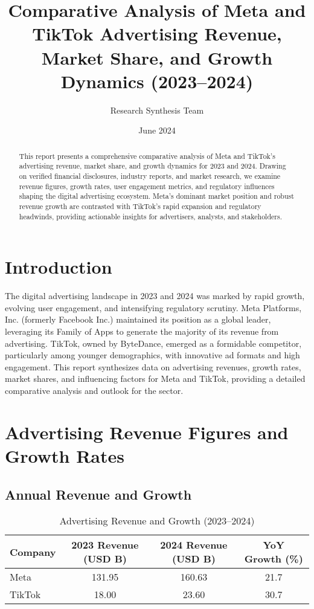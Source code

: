 \documentclass{article}
\title{Comparative Analysis of Meta and TikTok Advertising Revenue, Market Share, and Growth Dynamics (2023--2024)}
\author{Research Synthesis Team}
\date{June 2024}
\begin{document}
\maketitle

\begin{abstract}
This report presents a comprehensive comparative analysis of Meta and TikTok's advertising revenue, market share, and growth dynamics for 2023 and 2024. Drawing on verified financial disclosures, industry reports, and market research, we examine revenue figures, growth rates, user engagement metrics, and regulatory influences shaping the digital advertising ecosystem. Meta's dominant market position and robust revenue growth are contrasted with TikTok's rapid expansion and regulatory headwinds, providing actionable insights for advertisers, analysts, and stakeholders.
\end{abstract}

\section{Introduction}

The digital advertising landscape in 2023 and 2024 was marked by rapid growth, evolving user engagement, and intensifying regulatory scrutiny. Meta Platforms, Inc. (formerly Facebook Inc.) maintained its position as a global leader, leveraging its Family of Apps to generate the majority of its revenue from advertising. TikTok, owned by ByteDance, emerged as a formidable competitor, particularly among younger demographics, with innovative ad formats and high engagement. This report synthesizes data on advertising revenues, growth rates, market shares, and influencing factors for Meta and TikTok, providing a detailed comparative analysis and outlook for the sector.

\section{Advertising Revenue Figures and Growth Rates}

\subsection{Annual Revenue and Growth}

\begin{table}[ht]
\centering
\caption{Advertising Revenue and Growth (2023--2024)}
\label{tab:ad_revenue_growth}
\begin{tabularx}{\textwidth}{l S[table-format=3.2] S[table-format=3.2] S[table-format=2.1]}
\toprule
Company & {2023 Revenue (USD B)} & {2024 Revenue (USD B)} & {YoY Growth (\%)} \\
\midrule
Meta   & 131.95 & 160.63 & 21.7 \\
TikTok & 18.00  & 23.60  & 30.7 \\
\bottomrule
\end{tabularx}
\end{table}
\end{document}
